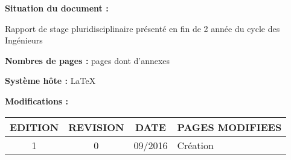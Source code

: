 \textbf{Situation du document :} 
\vspace{0.2cm}
\par
Rapport de stage pluridisciplinaire présenté en fin de 2 année du cycle des Ingénieurs
\vspace{0.3cm}



\textbf{Nombres de pages :}  pages dont  d'annexes
\vspace{0.3cm}

\textbf{Système hôte :} \LaTeX
\vspace{1cm}


\textbf{Modifications :} 
\begin{center}
\begin{tabular}{|c|c|c|>{\centering}p{6.5cm}|}
\hline 
EDITION & REVISION & DATE & PAGES MODIFIEES\tabularnewline
\hline
\hline 
1 & 0 & 09/2016 & Création\tabularnewline
\hline 

\end{tabular}
\end{center}